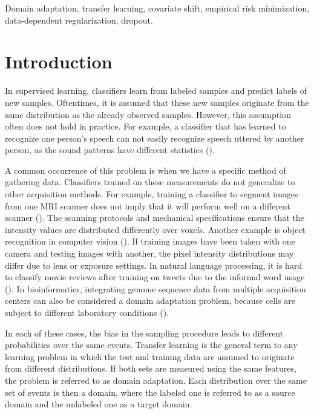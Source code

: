\documentclass[twoside,11pt]{article}
\begin{document}
\begin{keywords}
Domain adaptation, transfer learning, covariate shift, empirical risk minimization, data-dependent regularization, dropout.
\end{keywords}

\section{Introduction}

In supervised learning, classifiers learn from labeled samples and predict labels of new samples. Oftentimes, it is assumed that these new samples originate from the same distribution as the already observed samples. However, this assumption often does not hold in practice. For example, a classifier that has learned to recognize one person's speech can not easily recognize speech uttered by another person, as the sound patterns have different statistics (\citealp{leggetter1995maximum}). 

A common occurrence of this problem is when we have a specific method of gathering data. Classifiers trained on these measurements do not generalize to other acquisition methods. For example, training a classifier to segment images from one MRI scanner does not imply that it will perform well on a different scanner (\citealp{van2013transfer}). The scanning protocols and mechanical specifications ensure that the intensity values are distributed differently over voxels.
Another example is object recognition in computer vision (\citealp{saenko2010adapting}). If training images have been taken with one camera and testing images with another, the pixel intensity distributions may differ due to lens or exposure settings.
In natural language processing, it is hard to classify movie reviews after training on tweets due to the informal word usage (\citealp{peddinti2011domain}). In bioinformatics, integrating genome sequence data from multiple acquisition centers can also be considered a domain adaptation problem, because cells are subject to different laboratory conditions (\citealp{borgwardt2006integrating}). 

In each of these cases, the bias in the sampling procedure leads to different probabilities over the same events. Transfer learning is the general term to any learning problem in which the test and training data are assumed to originate from different distributions. If both sets are measured using the same features, the problem is referred to as domain adaptation. Each distribution over the same set of events is then a domain, where the labeled one is referred to as a source domain and the unlabeled one as a target domain.
\end{document}
